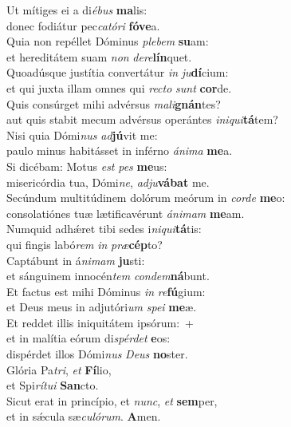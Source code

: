 \oddverse Ut mítiges ei a di\textit{é}\textit{bus} \textbf{ma}lis:~\*\\
\oddverse donec fodiátur pec\textit{ca}\textit{tó}\textit{ri} \textbf{fó}\textbf{ve}a.\\
\evenverse Quia non repéllet Dóminus \textit{ple}\textit{bem} \textbf{su}am:~\*\\
\evenverse et hereditátem suam \textit{non} \textit{de}\textit{re}\textbf{lín}quet.\\
\oddverse Quoadúsque justítia convertátur \textit{in} \textit{ju}\textbf{dí}cium:~\*\\
\oddverse et qui juxta illam omnes qui \textit{re}\textit{cto} \textit{sunt} \textbf{cor}de.\\
\evenverse Quis consúrget mihi advérsus \textit{ma}\textit{li}\textbf{gnán}tes?~\*\\
\evenverse aut quis stabit mecum advérsus operántes \textit{i}\textit{ni}\textit{qui}\textbf{tá}tem?\\
\oddverse Nisi quia Dómi\textit{nus} \textit{ad}\textbf{jú}vit me:~\*\\
\oddverse paulo minus habitásset in inférno \textit{á}\textit{ni}\textit{ma} \textbf{me}a.\\
\evenverse Si dicébam: Motus \textit{est} \textit{pes} \textbf{me}us:~\*\\
\evenverse misericórdia tua, Dómi\textit{ne}, \textit{ad}\textit{ju}\textbf{vá}\textbf{bat} me.\\
\oddverse Secúndum multitúdinem dolórum meórum in \textit{cor}\textit{de} \textbf{me}o:~\*\\
\oddverse consolatiónes tuæ lætificavérunt \textit{á}\textit{ni}\textit{mam} \textbf{me}am.\\
\evenverse Numquid adhǽret tibi sedes i\textit{ni}\textit{qui}\textbf{tá}tis:~\*\\
\evenverse qui fingis labó\textit{rem} \textit{in} \textit{præ}\textbf{cép}to?\\
\oddverse Captábunt in á\textit{ni}\textit{mam} \textbf{ju}sti:~\*\\
\oddverse et sánguinem innocén\textit{tem} \textit{con}\textit{dem}\textbf{ná}bunt.\\
\evenverse Et factus est mihi Dóminus \textit{in} \textit{re}\textbf{fú}gium:~\*\\
\evenverse et Deus meus in adjutóri\textit{um} \textit{spe}\textit{i} \textbf{me}æ.\\
\oddverse Et reddet illis iniquitátem ipsórum:~+\\
\oddverse  et in malítia eórum di\textit{spér}\textit{det} \textbf{e}os:~\*\\
\oddverse dispérdet illos Dómi\textit{nus} \textit{De}\textit{us} \textbf{no}ster.\\
\evenverse Glória Pa\textit{tri}, \textit{et} \textbf{Fí}lio,~\*\\
\evenverse et Spi\textit{rí}\textit{tu}\textit{i} \textbf{San}cto.\\
\oddverse Sicut erat in princípio, et \textit{nunc}, \textit{et} \textbf{sem}per,~\*\\
\oddverse et in sǽcula sæ\textit{cu}\textit{ló}\textit{rum}. \textbf{A}men.\\

